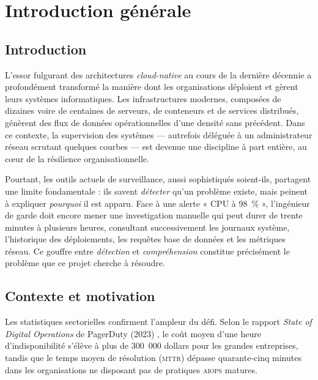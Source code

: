 \chapter{Introduction générale}

\section*{Introduction}

L'essor fulgurant des architectures \textit{cloud-native} au cours de la dernière
décennie a profondément transformé la manière dont les organisations déploient et
gèrent leurs systèmes informatiques. Les infrastructures modernes, composées de
dizaines voire de centaines de serveurs, de conteneurs et de services distribués,
génèrent des flux de données opérationnelles d'une densité sans précédent. Dans ce
contexte, la supervision des systèmes --- autrefois déléguée à un administrateur
réseau scrutant quelques courbes --- est devenue une discipline à part entière,
au cœur de la résilience organisationnelle.

Pourtant, les outils actuels de surveillance, aussi sophistiqués soient-ils,
partagent une limite fondamentale : ils savent \textit{détecter} qu'un problème
existe, mais peinent à expliquer \textit{pourquoi} il est apparu. Face à une alerte
« CPU à 98~\% », l'ingénieur de garde doit encore mener une investigation manuelle
qui peut durer de trente minutes à plusieurs heures, consultant successivement les
journaux système, l'historique des déploiements, les requêtes base de données et les
métriques réseau. Ce gouffre entre \textit{détection} et \textit{compréhension}
constitue précisément le problème que ce projet cherche à résoudre.

\section{Contexte et motivation}

Les statistiques sectorielles confirment l'ampleur du défi. Selon le rapport
\textit{State of Digital Operations} de PagerDuty (2023) \cite{pagerduty2023},
le coût moyen d'une heure d'indisponibilité s'élève à plus de 300~000 dollars
pour les grandes entreprises, tandis que le temps moyen de résolution (\textsc{mttr})
dépasse quarante-cinq minutes dans les organisations ne disposant pas de pratiques
\textsc{aiops} matures.

